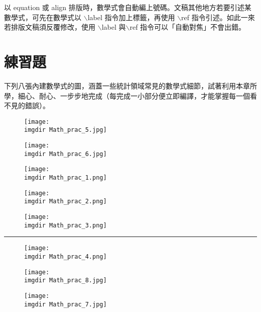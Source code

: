 以 {\A equation} 或 {\A align} 排版時，數學式會自動編上號碼。文稿其他地方若要引述某數學式，可先在數學式以 $\backslash${\A label} 指令加上標籤，再使用 $\backslash${\A ref} 指令引述。如此一來若排版文稿須反覆修改，使用 $\backslash${\A label} 與$\backslash${\A ref} 指令可以「自動對焦」不會出錯。

\section{練習題}
下列八張內建數學式的圖，涵蓋一些統計領域常見的數學式細節，試著利用本章所學，細心、耐心、一步步地完成（每完成一小部分便立即編譯，才能掌握每一個看不見的錯誤）。

\begin{figure}[h]
        \texttt{[image: \\imgdir Math\_prac\_5.jpg]}
\end{figure}

\begin{figure}[h]
        \texttt{[image: \\imgdir Math\_prac\_6.jpg]}
\end{figure}

\begin{figure}[h]
        \texttt{[image: \\imgdir Math\_prac\_1.png]}
\end{figure}

\begin{figure}[h]
        \texttt{[image: \\imgdir Math\_prac\_2.png]}
\end{figure}

\begin{figure}[h]
        \texttt{[image: \\imgdir Math\_prac\_3.png]}
\end{figure}
\rule{\textwidth}{0.2pt}
\begin{figure}[h]
        \texttt{[image: \\imgdir Math\_prac\_4.png]}
\end{figure}


\begin{figure}[h]
        \texttt{[image: \\imgdir Math\_prac\_8.jpg]}
\end{figure}

\begin{figure}[h]
        \texttt{[image: \\imgdir Math\_prac\_7.jpg]}
\end{figure}
%
